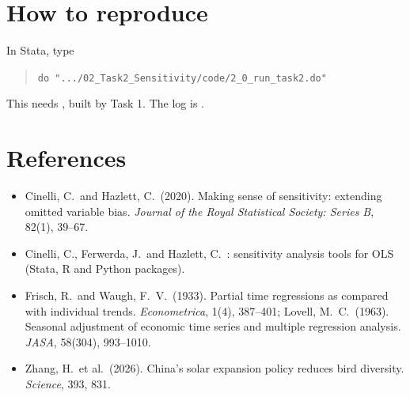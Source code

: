 \documentclass[11pt]{article}
\begin{document}
\section{How to reproduce}
In Stata, type
\begin{quote}\small\texttt{do ".../02\_Task2\_Sensitivity/code/2\_0\_run\_task2.do"}\end{quote} This needs , built by Task 1. The log is .

\section*{References}
{\small
\begin{itemize}[leftmargin=12pt,label={}]
\item Cinelli, C.\ and Hazlett, C.\ (2020). Making sense of sensitivity: extending omitted variable bias. \textit{Journal of the Royal Statistical Society: Series B}, 82(1), 39--67.
\item Cinelli, C., Ferwerda, J.\ and Hazlett, C.\ : sensitivity analysis tools for OLS (Stata, R and Python packages).
\item Frisch, R.\ and Waugh, F.\ V.\ (1933). Partial time regressions as compared with individual trends. \textit{Econometrica}, 1(4), 387--401; Lovell, M.\ C.\ (1963). Seasonal adjustment of economic time series and multiple regression analysis. \textit{JASA}, 58(304), 993--1010.
\item Zhang, H.\ et al.\ (2026). China's solar expansion policy reduces bird diversity. \textit{Science}, 393, 831.
\end{itemize}}
\end{document}
